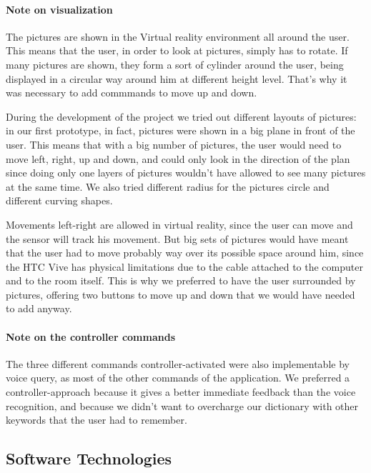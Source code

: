 \documentclass[11pt,a4paper]{article}
\begin{document}
\paragraph{Note on visualization} The pictures are shown in the Virtual reality environment all around the user. 
This means that the user, in order to look at pictures, simply has to rotate.
If many pictures are shown, they form a sort of cylinder around the user, being displayed in a circular way around him at different height level. That's why it was necessary to add commmands to move up and down.

During the development of the project we tried out different layouts of pictures: in our first prototype, in fact, pictures were shown in a big plane in front of the user. This means that with a big number of pictures, the user would need to move left, right, up and down, and could only look in the direction of the plan since doing only one layers of pictures wouldn't have allowed to see many pictures at the same time. We also tried different radius for the pictures circle and different curving shapes.

Movements left-right are allowed in virtual reality, since the user can move and the sensor will track his movement. But big sets of pictures would have meant that the user had to move probably way over its possible space around him, since the HTC Vive has physical limitations due to the cable attached to the computer and to the room itself.
This is why we preferred to have the user surrounded by pictures, offering two buttons to move up and down that we would have needed to add anyway.

\paragraph{Note on the controller commands} The three different commands controller-activated were also implementable by voice query, as most of the other commands of the application.
We preferred a controller-approach because it gives a better immediate feedback than the voice recognition, and because we didn't want to overcharge our dictionary with other keywords that the user had to remember.
\subsection{Software Technologies} \label{techntechno}
\end{document}
